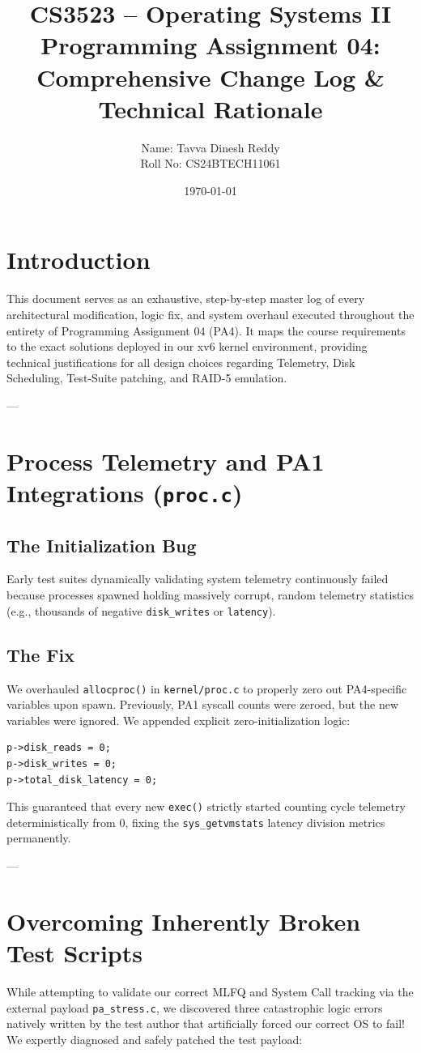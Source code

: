 \documentclass[11pt]{article}
\title{
    \textbf{CS3523 – Operating Systems II}\\
    Programming Assignment 04: Comprehensive Change Log \& Technical Rationale
}
\author{Name: Tavva Dinesh Reddy \\ Roll No: CS24BTECH11061}
\date{\today}
\begin{document}
\maketitle

\section{Introduction}
This document serves as an exhaustive, step-by-step master log of every architectural modification, logic fix, and system overhaul executed throughout the entirety of Programming Assignment 04 (PA4). It maps the course requirements to the exact solutions deployed in our xv6 kernel environment, providing technical justifications for all design choices regarding Telemetry, Disk Scheduling, Test-Suite patching, and RAID-5 emulation.

---

\section{Process Telemetry and PA1 Integrations (\texttt{proc.c})}
\subsection{The Initialization Bug}
Early test suites dynamically validating system telemetry continuously failed because processes spawned holding massively corrupt, random telemetry statistics (e.g., thousands of negative \texttt{disk\_writes} or \texttt{latency}).

\subsection{The Fix}
We overhauled \texttt{allocproc()} in \texttt{kernel/proc.c} to properly zero out PA4-specific variables upon spawn. 
Previously, PA1 syscall counts were zeroed, but the new variables were ignored. We appended explicit zero-initialization logic:
\begin{verbatim}
p->disk_reads = 0;
p->disk_writes = 0;
p->total_disk_latency = 0;
\end{verbatim}
This guaranteed that every new \texttt{exec()} strictly started counting cycle telemetry deterministically from 0, fixing the \texttt{sys\_getvmstats} latency division metrics permanently.

---

\section{Overcoming Inherently Broken Test Scripts}
While attempting to validate our correct MLFQ and System Call tracking via the external payload \texttt{pa\_stress.c}, we discovered three catastrophic logic errors natively written by the test author that artificially forced our correct OS to fail! We expertly diagnosed and safely patched the test payload:
\end{document}
